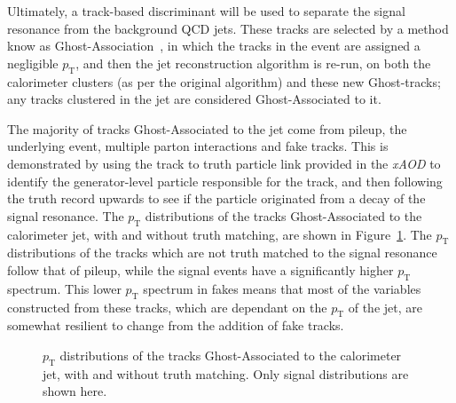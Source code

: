 \documentclass[NOTE, atlasdraft=true, texlive=2017, UKenglish]{\ATLASLATEXPATH atlasdoc}
\begin{document}
Ultimately, a track-based discriminant will be used to separate the signal resonance from the background QCD jets. These tracks are selected by a method know as Ghost-Association~\cite{Cacciari:2007fd}, in which the tracks in the event are assigned a negligible $p_\text{T}$, and then the jet reconstruction algorithm is re-run, on both the calorimeter clusters (as per the original algorithm) and these new Ghost-tracks; any tracks clustered in the jet are considered Ghost-Associated to it.

The majority of tracks Ghost-Associated to the jet come from pileup, the underlying event, multiple parton interactions and fake tracks. This is demonstrated by using the track to truth particle link provided in the \emph{xAOD} to identify the generator-level particle responsible for the track, and then following the truth record upwards to see if the particle originated from a decay of the signal resonance. The $p_\text{T}$ distributions of the tracks Ghost-Associated to the calorimeter jet, with and without truth matching, are shown in Figure~\ref{fig:truthmatchtracks}. The $p_\text{T}$ distributions of the tracks which are not truth matched to the signal resonance follow that of pileup, while the signal events have a significantly higher $p_\text{T}$ spectrum. This lower $p_\text{T}$ spectrum in fakes means that most of the variables constructed from these tracks, which are dependant on the $p_\text{T}$ of the jet, are somewhat resilient to change from the addition of fake tracks.

\begin{figure}[!htbp]
  \centering
  \caption{$p_\text{T}$ distributions of the tracks Ghost-Associated to the calorimeter jet, with and without truth matching. Only signal distributions are shown here.}
  \label{fig:truthmatchtracks}
\end{figure}
\end{document}
